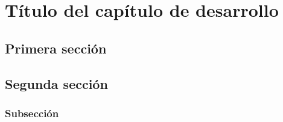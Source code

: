 
\chapter{Título del capítulo de desarrollo}

\lipsum[4]

\section{Primera sección}

\lipsum[5]

\section{Segunda sección}

\lipsum[6]

\subsection{Subsección}

\lipsum[7]
